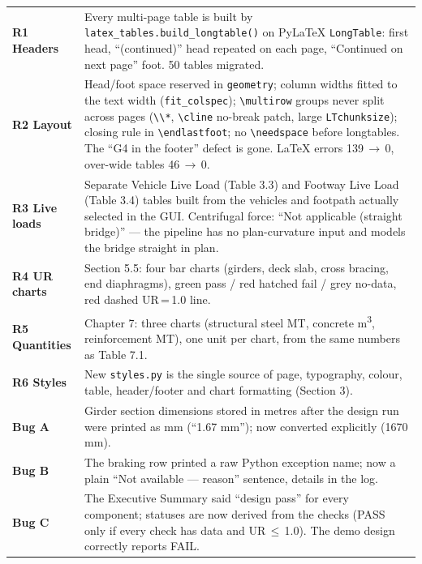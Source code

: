 \documentclass[10pt,a4paper]{article}
\newcommand{\f}[1]{\texttt{#1}}
\begin{document}
\begin{longtable}{@{}>{\raggedright\bfseries}p{2.5cm}p{14.6cm}@{}}
R1 Headers & Every multi-page table is built by \f{latex\_tables.build\_longtable()} on PyLaTeX \f{LongTable}: first head, ``(continued)'' head repeated on each page, ``Continued on next page'' foot. 50 tables migrated.\\
R2 Layout & Head/foot space reserved in \f{geometry}; column widths fitted to the text width (\f{fit\_colspec}); \verb|\multirow| groups never split across pages (\verb|\\*|, \verb|\cline| no-break patch, large \f{LTchunksize}); closing rule in \verb|\endlastfoot|; no \verb|\needspace| before longtables. The ``G4 in the footer'' defect is gone. LaTeX errors 139\,$\to$\,0, over-wide tables 46\,$\to$\,0.\\
R3 Live loads & Separate Vehicle Live Load (Table 3.3) and Footway Live Load (Table 3.4) tables built from the vehicles and footpath actually selected in the GUI. Centrifugal force: ``Not applicable (straight bridge)'' --- the pipeline has no plan-curvature input and models the bridge straight in plan.\\
R4 UR charts & Section 5.5: four bar charts (girders, deck slab, cross bracing, end diaphragms), green pass / red hatched fail / grey no-data, red dashed UR\,=\,1.0 line.\\
R5 Quantities & Chapter 7: three charts (structural steel MT, concrete m\textsuperscript{3}, reinforcement MT), one unit per chart, from the same numbers as Table 7.1.\\
R6 Styles & New \f{styles.py} is the single source of page, typography, colour, table, header/footer and chart formatting (Section 3).\\
Bug A & Girder section dimensions stored in metres after the design run were printed as mm (``1.67 mm''); now converted explicitly (1670 mm).\\
Bug B & The braking row printed a raw Python exception name; now a plain ``Not available --- reason'' sentence, details in the log.\\
Bug C & The Executive Summary said ``design pass'' for every component; statuses are now derived from the checks (PASS only if every check has data and UR\,$\le$\,1.0). The demo design correctly reports FAIL.\\
\end{longtable}
\end{document}
